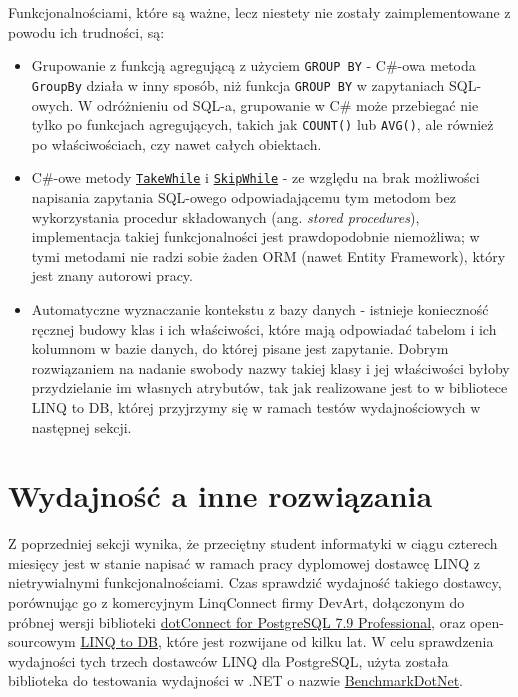 Funkcjonalnościami, które są ważne, lecz niestety nie zostały zaimplementowane z powodu ich trudności, są:

\begin{itemize}
\item Grupowanie z funkcją agregującą z użyciem \texttt{GROUP BY} - C\#-owa metoda \texttt{GroupBy} działa w inny sposób, niż funkcja \texttt{GROUP BY} w zapytaniach SQL-owych. W odróżnieniu od SQL-a, grupowanie w C\# może przebiegać nie tylko po funkcjach agregujących, takich jak \texttt{COUNT()} lub \texttt{AVG()}, ale również po właściwościach, czy nawet całych obiektach.
\item C\#-owe metody \href{https://msdn.microsoft.com/pl-pl/library/bb534804(v=vs.110).aspx}{\texttt{TakeWhile}} i \href{https://www.google.pl/url?sa=t&rct=j&q=&esrc=s&source=web&cd=1&cad=rja&uact=8&ved=0ahUKEwj43ai66LPUAhVCVhQKHSm4BfkQFggnMAA&url=https%3A%2F%2Fmsdn.microsoft.com%2Fpl-pl%2Flibrary%2Fbb549075(v%3Dvs.110).aspx&usg=AFQjCNHEbD9WVhCdEeCDPQw0CIt845i9Kg&sig2=41OZNQAxqA1IYG9QzuzK1g}{\texttt{SkipWhile}} - ze względu na brak możliwości napisania zapytania SQL-owego odpowiadającemu tym metodom bez wykorzystania procedur składowanych (ang. \textit{stored procedures}), implementacja takiej funkcjonalności jest prawdopodobnie niemożliwa; w tymi metodami nie radzi sobie żaden ORM (nawet Entity Framework), który jest znany autorowi pracy.
\item Automatyczne wyznaczanie kontekstu z bazy danych - istnieje konieczność ręcznej budowy klas i ich właściwości, które mają odpowiadać tabelom i ich kolumnom w bazie danych, do której pisane jest zapytanie. Dobrym rozwiązaniem na nadanie swobody nazwy takiej klasy i jej właściwości byłoby przydzielanie im własnych atrybutów, tak jak realizowane jest to w bibliotece LINQ to DB, której przyjrzymy się w ramach testów wydajnościowych w następnej sekcji.
\end{itemize}

\section{Wydajność a inne rozwiązania}
Z poprzedniej sekcji wynika, że przeciętny student informatyki w ciągu czterech miesięcy jest w stanie napisać w ramach pracy dyplomowej dostawcę LINQ z nietrywialnymi funkcjonalnościami. Czas sprawdzić wydajność takiego dostawcy, porównując go z komercyjnym LinqConnect firmy DevArt, dołączonym do próbnej wersji biblioteki \href{https://www.devart.com/dotconnect/postgresql/}{dotConnect for PostgreSQL 7.9 Professional}, oraz open-sourcowym \href{https://github.com/linq2db/linq2db}{LINQ to DB}, które jest rozwijane od kilku lat. W celu sprawdzenia wydajności tych trzech dostawców LINQ dla PostgreSQL, użyta została biblioteka do testowania wydajności w .NET o nazwie \href{https://github.com/dotnet/BenchmarkDotNet}{BenchmarkDotNet}.

